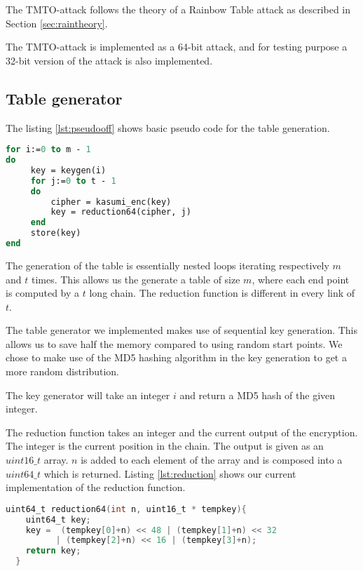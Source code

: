 The TMTO-attack follows the theory of a Rainbow Table attack as
described in Section \ref{sec:raintheory}.

The TMTO-attack is implemented as a 64-bit attack, and for testing
purpose a 32-bit version of the attack is also implemented.

\subsection{Table generator}

The listing \ref{lst:pseudooff} shows basic pseudo code for the table generation.

\begin{lstlisting}[frame=single, language=Pascal, mathescape,
captionpos=b, caption={Pseudo code for table generation}, label={lst:pseudooff}]
for i:=0 to m - 1
do
     key = keygen(i)
     for j:=0 to t - 1
     do
         cipher = kasumi_enc(key)
         key = reduction64(cipher, j)
     end
     store(key)
end
\end{lstlisting}
The generation of the table is essentially nested  loops iterating
respectively $m$ and $t$ times. This allows us the generate a table of
size $m$, where each end point is computed by a $t$ long chain. The
reduction function is different in every link of $t$.

The table generator we implemented makes use of sequential key
generation. This allows us to save half the memory compared to using
random start points. We chose to make use of the MD5 hashing algorithm
in the key generation to get a more random distribution.

The key generator will take an integer $i$ and return a MD5 hash of
the given integer.

The reduction function takes an integer and the current output of the encryption. The
integer is the current position in the chain. The output is given as an
$uint16\_t$ array. $n$ is added to each element of the array and is composed
into a $uint64\_t$ which is returned. Listing \ref{lst:reduction}
shows our current implementation of the reduction function.

\begin{lstlisting}[frame=single, language=C, mathescape,
captionpos=b, caption={Example reduction function}, label={lst:reduction}]
uint64_t reduction64(int n, uint16_t * tempkey){
    uint64_t key;
    key =  (tempkey[0]+n) << 48 | (tempkey[1]+n) << 32
          | (tempkey[2]+n) << 16 | (tempkey[3]+n);
    return key;
  }
\end{lstlisting}

